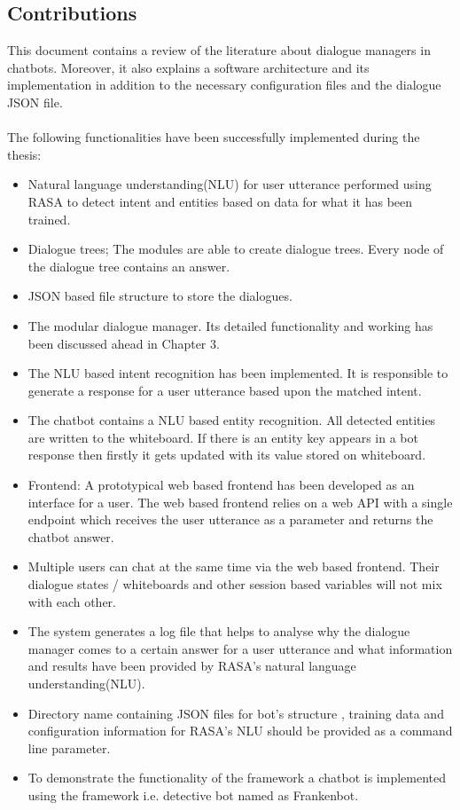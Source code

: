 \subsection{Contributions}
This document contains a review of the literature about dialogue managers in chatbots. Moreover, it also explains a software architecture and its implementation in addition to the necessary configuration files and the dialogue JSON file.
\\~\\
The following functionalities have been successfully implemented during the thesis:
\begin{itemize}
  \item Natural language understanding(NLU) for user utterance performed using RASA to detect intent and entities based on data for what it has been trained.
   \item Dialogue trees; The modules are able to create dialogue trees. Every node of the dialogue tree contains an answer.
   \item JSON based file structure to store the dialogues.
   \item The modular dialogue manager. Its detailed functionality and working has been discussed ahead in Chapter 3.
   \item The NLU based intent recognition has been implemented. It is responsible to generate a response for a user utterance based upon the matched intent.
   \item The chatbot contains a NLU based entity recognition. All detected entities are written to the whiteboard. If there is an entity key appears in a bot response then firstly it gets updated with its value stored on whiteboard.
   \item Frontend: A prototypical web based frontend has been developed as an interface for a user. The web based frontend relies on a  web API with a single endpoint which receives the user utterance as a parameter and returns the chatbot answer.
   \item Multiple users can chat at the same time via the web based frontend. Their dialogue states / whiteboards and other session based variables will not mix with each other.
   \item The system generates a log file that helps to analyse why the dialogue manager comes to a certain answer for a user utterance and what information and results have been provided by RASA's natural language understanding(NLU).
   \item Directory name containing JSON files for bot's structure , training data and configuration information for RASA's NLU should be provided as a command line parameter.
   \item To demonstrate the functionality of the framework a chatbot is implemented using the framework i.e. detective bot named as Frankenbot.
\end{itemize}

